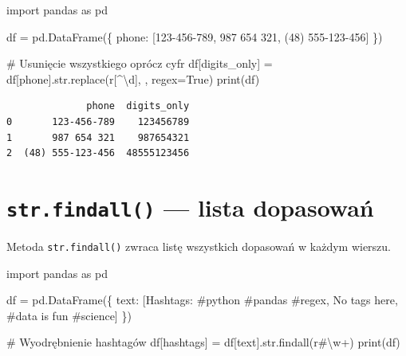 \documentclass[
  polish,
  letterpaper,
  DIV=11,
  numbers=noendperiod]{scrreprt}
\newenvironment{Shaded}{\begin{snugshade}}{\end{snugshade}}
\newcommand{\BuiltInTok}[1]{\textcolor[rgb]{0.00,0.23,0.31}{#1}}
\newcommand{\CommentTok}[1]{\textcolor[rgb]{0.37,0.37,0.37}{#1}}
\newcommand{\DecValTok}[1]{\textcolor[rgb]{0.68,0.00,0.00}{#1}}
\newcommand{\ImportTok}[1]{\textcolor[rgb]{0.00,0.46,0.62}{#1}}
\newcommand{\NormalTok}[1]{\textcolor[rgb]{0.00,0.23,0.31}{#1}}
\newcommand{\OperatorTok}[1]{\textcolor[rgb]{0.37,0.37,0.37}{#1}}
\newcommand{\PreprocessorTok}[1]{\textcolor[rgb]{0.68,0.00,0.00}{#1}}
\newcommand{\StringTok}[1]{\textcolor[rgb]{0.13,0.47,0.30}{#1}}
\newcommand{\VariableTok}[1]{\textcolor[rgb]{0.07,0.07,0.07}{#1}}
\newcommand{\VerbatimStringTok}[1]{\textcolor[rgb]{0.13,0.47,0.30}{#1}}
\begin{document}
\begin{Shaded}
\begin{Highlighting}[]
\ImportTok{import}\NormalTok{ pandas }\ImportTok{as}\NormalTok{ pd}

\NormalTok{df }\OperatorTok{=}\NormalTok{ pd.DataFrame(\{}
    \StringTok{\textquotesingle{}phone\textquotesingle{}}\NormalTok{: [}\StringTok{\textquotesingle{}123{-}456{-}789\textquotesingle{}}\NormalTok{, }\StringTok{\textquotesingle{}987 654 321\textquotesingle{}}\NormalTok{, }\StringTok{\textquotesingle{}(48) 555{-}123{-}456\textquotesingle{}}\NormalTok{]}
\NormalTok{\})}

\CommentTok{\# Usunięcie wszystkiego oprócz cyfr}
\NormalTok{df[}\StringTok{\textquotesingle{}digits\_only\textquotesingle{}}\NormalTok{] }\OperatorTok{=}\NormalTok{ df[}\StringTok{\textquotesingle{}phone\textquotesingle{}}\NormalTok{].}\BuiltInTok{str}\NormalTok{.replace(}\VerbatimStringTok{r\textquotesingle{}}\PreprocessorTok{[\^{}}\DecValTok{\textbackslash{}d}\PreprocessorTok{]}\VerbatimStringTok{\textquotesingle{}}\NormalTok{, }\StringTok{\textquotesingle{}\textquotesingle{}}\NormalTok{, regex}\OperatorTok{=}\VariableTok{True}\NormalTok{)}
\BuiltInTok{print}\NormalTok{(df)}
\end{Highlighting}
\end{Shaded}

\begin{verbatim}
              phone  digits_only
0       123-456-789    123456789
1       987 654 321    987654321
2  (48) 555-123-456  48555123456
\end{verbatim}

\section{\texorpdfstring{\texttt{str.findall()} --- lista
dopasowań}{str.findall() --- lista dopasowań}}\label{str.findall-lista-dopasowaux144}

Metoda \texttt{str.findall()} zwraca listę wszystkich dopasowań w każdym
wierszu.

\begin{Shaded}
\begin{Highlighting}[]
\ImportTok{import}\NormalTok{ pandas }\ImportTok{as}\NormalTok{ pd}

\NormalTok{df }\OperatorTok{=}\NormalTok{ pd.DataFrame(\{}
    \StringTok{\textquotesingle{}text\textquotesingle{}}\NormalTok{: [}\StringTok{\textquotesingle{}Hashtags: \#python \#pandas \#regex\textquotesingle{}}\NormalTok{, }\StringTok{\textquotesingle{}No tags here\textquotesingle{}}\NormalTok{, }\StringTok{\textquotesingle{}\#data is fun \#science\textquotesingle{}}\NormalTok{]}
\NormalTok{\})}

\CommentTok{\# Wyodrębnienie hashtagów}
\NormalTok{df[}\StringTok{\textquotesingle{}hashtags\textquotesingle{}}\NormalTok{] }\OperatorTok{=}\NormalTok{ df[}\StringTok{\textquotesingle{}text\textquotesingle{}}\NormalTok{].}\BuiltInTok{str}\NormalTok{.findall(}\VerbatimStringTok{r\textquotesingle{}\#}\DecValTok{\textbackslash{}w}\OperatorTok{+}\VerbatimStringTok{\textquotesingle{}}\NormalTok{)}
\BuiltInTok{print}\NormalTok{(df)}
\end{Highlighting}
\end{Shaded}
\end{document}
